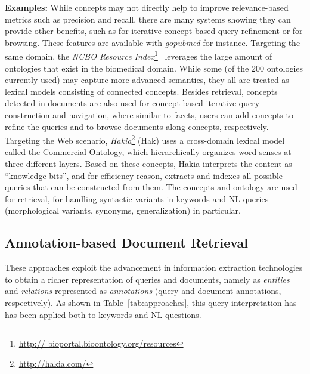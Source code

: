 \textbf{Examples:} While concepts may not directly help to improve relevance-based metrics such as precision and recall, there are many systems showing they can provide other benefits, such as for iterative concept-based query refinement or for browsing. These features are available with \emph{gopubmed} for instance. Targeting the same domain, the \emph{NCBO Resource Index}\footnote{\url{http://
bioportal.bioontology.org/resources}}~\cite{DBLP:journals/ws/JonquetLFCNMS11} leverages the large amount of ontologies that exist in the biomedical domain. While some (of the 200 ontologies currently used) may capture more advanced semantics, they all are treated as lexical models consisting of connected concepts. Besides retrieval, concepts detected in documents are also used for concept-based iterative query construction and navigation, where similar to facets, users can add concepts to refine the queries and to browse documents along concepts, respectively. Targeting the Web scenario, \emph{Hakia}\footnote{\url{http://hakia.com/}} (Hak) uses a cross-domain lexical model called the Commercial Ontology, which hierarchically organizes word senses at three different layers. Based on these concepts, Hakia interprets the content as ``knowledge bits'', and for efficiency reason, extracts and indexes all possible queries that can be constructed from them. The concepts and ontology are used for retrieval, for handling syntactic variants in keywords and NL queries (morphological variants, synonyms, generalization) in particular.  

\subsection{Annotation-based Document Retrieval} These approaches exploit the advancement in information extraction technologies to obtain a richer representation of queries and documents, namely as \emph{entities} and \emph{relations} represented as \emph{annotations} (query and document annotations, respectively). As shown in Table~\ref{tab:approaches}, this query interpretation has has been applied both to keywords and NL questions. 

